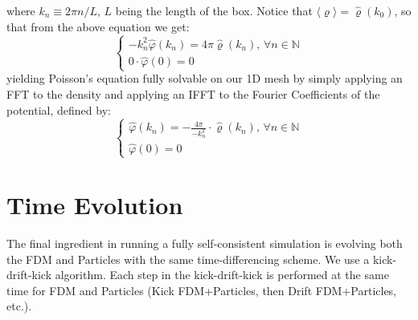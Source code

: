 \documentclass{book}
\begin{document}
where $k_n \equiv 2\pi n / L$, $L$ being the length of the box. Notice that $\langle\varrho\rangle = \hat{\varrho}(k_0)$, so that from the above equation we get:
\begin{equation*}
    \begin{cases}
    -k_n^2 \hat{\varphi}(k_n) = 4 \pi \hat{\varrho}(k_n) \text{, $\forall n \in \mathbb{N}$} \\
    0\cdot \hat{\varphi}(0) = 0
    \end{cases}
\end{equation*}
yielding Poisson's equation fully solvable on our 1D mesh by simply applying an FFT to the density and applying an IFFT to the Fourier Coefficients of the potential, defined by:
\begin{equation*}
    \begin{cases}
    \hat{\varphi}(k_n) = - \frac{4 \pi}{-k_n^2} \cdot \hat{\varrho}(k_n) \text{, $\forall n \in \mathbb{N}$} \\
    \hat{\varphi}(0) = 0
    \end{cases}
\end{equation*}

\section{Time Evolution}

The final ingredient in running a fully self-consistent simulation is evolving both the FDM and Particles with the same time-differencing scheme. We use a kick-drift-kick algorithm. Each step in the kick-drift-kick is performed at the same time for FDM and Particles (Kick FDM+Particles, then Drift FDM+Particles, etc.).
\end{document}
